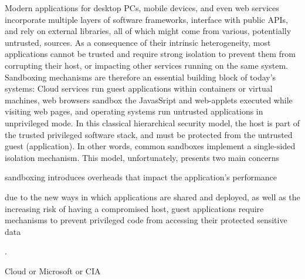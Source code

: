 Modern applications for desktop PCs, mobile devices, and even web services incorporate multiple layers of software frameworks, interface with public APIs, and rely on external libraries, all of which might come from various, potentially untrusted, sources.
As a consequence of their intrinsic heterogeneity, most applications cannot be trusted and require strong isolation to prevent them from corrupting their host, or impacting other services running on the same system.
Sandboxing mechanisms are therefore an essential building block of today's systems: Cloud services run guest applications within containers or virtual machines, web browsers sandbox the JavasSript and web-applets executed while visiting web pages, and operating systems run untrusted applications in unprivileged mode.
In this classical hierarchical security model, the host is part of the trusted privileged software stack, and must be protected from the untrusted guest (application).
In other words, common sandboxes implement a single-sided isolation mechanism.
This model, unfortunately, presents two main concerns 
\begin{enumerate*}
	\item sandboxing introduces overheads that impact the application's performance
	\item due to the new ways in which applications are shared and deployed, as well as the increasing risk of having a compromised host, guest applications require mechanisms to prevent privileged code from accessing their protected sensitive data
\end{enumerate*}.


Cloud or Microsoft or CIA



